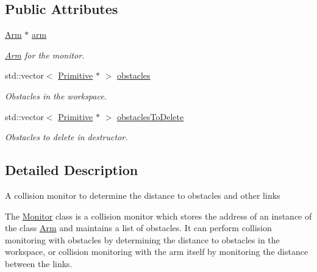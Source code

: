 \subsection*{Public Attributes}
\begin{DoxyCompactItemize}
\item 
\hyperlink{class_arm}{Arm} $\ast$ \hyperlink{class_monitor_a8b75571f6224f999a3dc05cf9a83fa68}{arm}\hypertarget{class_monitor_a8b75571f6224f999a3dc05cf9a83fa68}{}\label{class_monitor_a8b75571f6224f999a3dc05cf9a83fa68}

\begin{DoxyCompactList}\small\item\em \hyperlink{class_arm}{Arm} for the monitor. \end{DoxyCompactList}\item 
std\+::vector$<$ \hyperlink{class_primitive}{Primitive} $\ast$ $>$ \hyperlink{class_monitor_a05fd42482269ad65432d5400c8f0f9b5}{obstacles}\hypertarget{class_monitor_a05fd42482269ad65432d5400c8f0f9b5}{}\label{class_monitor_a05fd42482269ad65432d5400c8f0f9b5}

\begin{DoxyCompactList}\small\item\em Obstacles in the workspace. \end{DoxyCompactList}\item 
std\+::vector$<$ \hyperlink{class_primitive}{Primitive} $\ast$ $>$ \hyperlink{class_monitor_a2207169c2b32b3bbf9925f3254064dee}{obstacles\+To\+Delete}\hypertarget{class_monitor_a2207169c2b32b3bbf9925f3254064dee}{}\label{class_monitor_a2207169c2b32b3bbf9925f3254064dee}

\begin{DoxyCompactList}\small\item\em Obstacles to delete in destructor. \end{DoxyCompactList}\end{DoxyCompactItemize}


\subsection{Detailed Description}
A collision monitor to determine the distance to obstacles and other links

The \hyperlink{class_monitor}{Monitor} class is a collision monitor which stores the address of an instance of the class \hyperlink{class_arm}{Arm} and maintains a list of obstacles. It can perform collision monitoring with obstacles by determining the distance to obstacles in the workspace, or collision monitoring with the arm itself by monitoring the distance between the links. 

